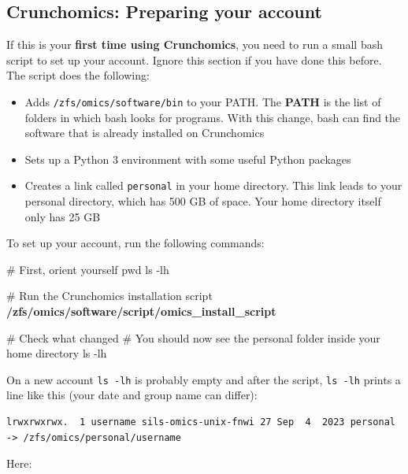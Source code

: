 \documentclass[
  letterpaper,
  DIV=11,
  numbers=noendperiod]{scrreprt}
\newenvironment{Shaded}{}{}
\newcommand{\AttributeTok}[1]{\textcolor[rgb]{0.84,0.23,0.29}{#1}}
\newcommand{\BuiltInTok}[1]{\textcolor[rgb]{0.84,0.23,0.29}{#1}}
\newcommand{\CommentTok}[1]{\textcolor[rgb]{0.42,0.45,0.49}{#1}}
\newcommand{\ExtensionTok}[1]{\textcolor[rgb]{0.84,0.23,0.29}{\textbf{#1}}}
\newcommand{\FunctionTok}[1]{\textcolor[rgb]{0.44,0.26,0.76}{#1}}
\providecommand{\tightlist}{%
  \setlength{\itemsep}{0pt}\setlength{\parskip}{0pt}}
\begin{document}
\subsection{Crunchomics: Preparing your
account}\label{crunchomics-preparing-your-account}

If this is your \textbf{first time using Crunchomics}, you need to run a
small bash script to set up your account. Ignore this section if you
have done this before. The script does the following:

\begin{itemize}
\tightlist
\item
  Adds \texttt{/zfs/omics/software/bin} to your PATH. The \textbf{PATH}
  is the list of folders in which bash looks for programs. With this
  change, bash can find the software that is already installed on
  Crunchomics
\item
  Sets up a Python 3 environment with some useful Python packages
\item
  Creates a link called \texttt{personal} in your home directory. This
  link leads to your personal directory, which has 500 GB of space. Your
  home directory itself only has 25 GB
\end{itemize}

To set up your account, run the following commands:

\begin{Shaded}
\begin{Highlighting}[]
\CommentTok{\# First, orient yourself}
\BuiltInTok{pwd}
\FunctionTok{ls} \AttributeTok{{-}lh}

\CommentTok{\# Run the Crunchomics installation script}
\ExtensionTok{/zfs/omics/software/script/omics\_install\_script}

\CommentTok{\# Check what changed}
\CommentTok{\# You should now see the personal folder inside your home directory}
\FunctionTok{ls} \AttributeTok{{-}lh}
\end{Highlighting}
\end{Shaded}

On a new account \texttt{ls\ -lh} is probably empty and after the
script, \texttt{ls\ -lh} prints a line like this (your date and group
name can differ):

\begin{verbatim}
lrwxrwxrwx.  1 username sils-omics-unix-fnwi 27 Sep  4  2023 personal -> /zfs/omics/personal/username
\end{verbatim}

Here:
\end{document}
